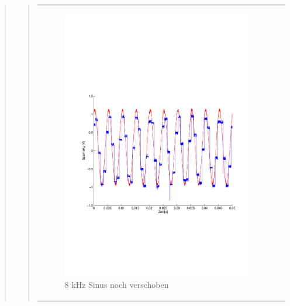 \begin{quote}
\begin{quote}
\begin{center}
\begin{tabular}{ll}
            \hspace{-4cm}
                \begin{minipage}{0.6\textwidth}
                    \begin{figure}[H]
                        \includegraphics[scale=0.5, trim = 16mm 70mm 16mm 85mm, clip]
                                        {Bilder/8kHz_sin_Signal_Rekonstuiert}
                          \caption{8 kHz Sinus noch verschoben}
                          \label{fig:8kHz_sin_rek}
                    \end{figure}
                \end{minipage}
                

\end{tabular}
\end{center}
\end{quote}
\end{quote}
